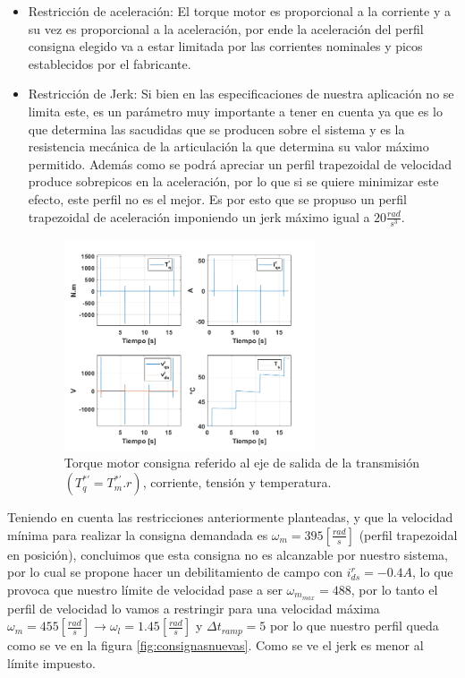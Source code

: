 \documentclass[10pt]{article}
\begin{document}
\begin{itemize}
\begin{itemize}
	 \item Restricción de aceleración: El torque motor es proporcional a la corriente y a su vez es proporcional a la aceleración, por ende la aceleración del perfil consigna elegido
	 va a estar limitada por las corrientes nominales y picos establecidos por el fabricante.

	 \item Restricción de Jerk: Si bien en las especificaciones de nuestra aplicación no se limita este, es un parámetro muy importante a tener en cuenta ya que es lo que determina las sacudidas 
	 que se producen sobre el sistema y es la resistencia mecánica de la articulación la que determina su valor máximo permitido. Además como se podrá apreciar un perfil trapezoidal de velocidad
	 produce sobrepicos en la aceleración, por lo que si se quiere minimizar este efecto, este perfil no es el mejor. Es por esto que se propuso un perfil trapezoidal de aceleración imponiendo un jerk máximo igual a $20 \frac{rad}{s^{3}}$.
\begin{figure}[h!]
	\centering
	\includegraphics[width=0.7\textwidth]{parametros.png}
	\caption{\label{fig:parametros}Torque motor consigna referido al eje de salida de la transmisión $(T^{*'}_{q}=T^{*'}_{m}.r)$, corriente, tensión y temperatura.}
	\end{figure}
 \end{itemize}

 Teniendo en cuenta las restricciones anteriormente planteadas, y que la velocidad mínima para realizar la consigna demandada es $\omega_{m}=395[\frac{rad}{s}]$ (perfil trapezoidal en posición), concluimos que esta consigna no es alcanzable
 por nuestro sistema, por lo cual se propone hacer un debilitamiento
 de campo con $i^{r}_{ds}=-0.4A$, lo que provoca que nuestro límite de velocidad pase a ser $\omega_{m_{max}}=488$, por lo tanto el perfil de velocidad lo vamos a restringir para una velocidad máxima $\omega_{m}=455[\frac{rad}{s}]\rightarrow \omega_{l}=1.45[\frac{rad}{s}]$ y 
 $\Delta t_{ramp}=5$ por lo que nuestro perfil queda como se ve en la figura \ref{fig:consignasnuevas}. Como se ve el jerk es menor al límite impuesto.
 

\end{itemize}
\end{document}
